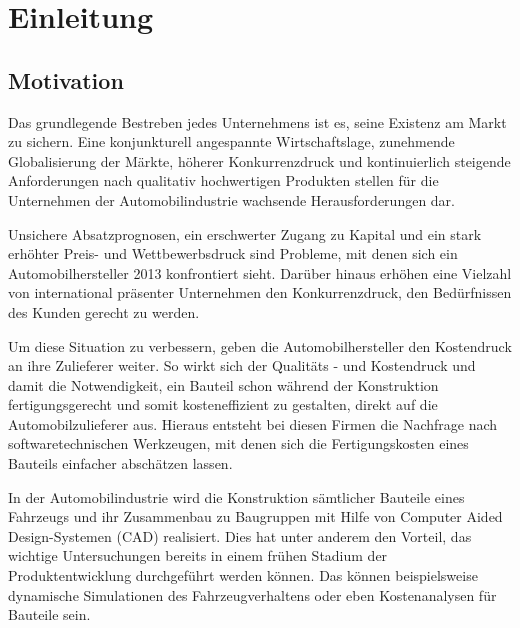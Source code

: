 
\chapter{Einleitung}
\label{cha:Einleitung}

\section{Motivation}

Das grundlegende Bestreben jedes Unternehmens ist es, seine Existenz am Markt zu sichern. Eine konjunkturell angespannte Wirtschaftslage, zunehmende Globalisierung der M\"arkte, h\"oherer Konkurrenzdruck und kontinuierlich steigende Anforderungen nach qualitativ hochwertigen Produkten stellen für die Unternehmen der Automobilindustrie wachsende Herausforderungen dar. 

Unsichere Absatzprognosen, ein erschwerter Zugang zu Kapital und ein stark erh\"ohter Preis- und Wettbewerbsdruck sind Probleme,
mit denen sich ein Automobilhersteller 2013 konfrontiert sieht. Dar\"uber hinaus erh\"ohen eine Vielzahl von international pr\"asenter Unternehmen den Konkurrenzdruck, den Bed\"urfnissen des Kunden gerecht zu werden.

Um diese Situation zu verbessern, geben die Automobilhersteller den Kostendruck an ihre Zulieferer weiter. So wirkt sich der Qualit\"ats - und Kostendruck und damit die Notwendigkeit, ein Bauteil schon w\"ahrend der Konstruktion fertigungsgerecht und somit kosteneffizient zu gestalten, direkt auf die Automobilzulieferer aus. Hieraus entsteht bei diesen Firmen die Nachfrage nach softwaretechnischen Werkzeugen, mit denen sich die Fertigungskosten eines Bauteils einfacher absch\"atzen lassen. 

In der Automobilindustrie wird die Konstruktion s\"amtlicher Bauteile eines Fahrzeugs und ihr Zusammenbau zu Baugruppen mit Hilfe von Computer Aided Design-Systemen (CAD) realisiert. Dies hat unter anderem den Vorteil, das wichtige Untersuchungen bereits in einem fr\"uhen Stadium der Produktentwicklung durchgef\"uhrt werden k\"onnen. Das k\"onnen beispielsweise dynamische Simulationen des Fahrzeugverhaltens oder eben Kostenanalysen f\"ur Bauteile sein.


